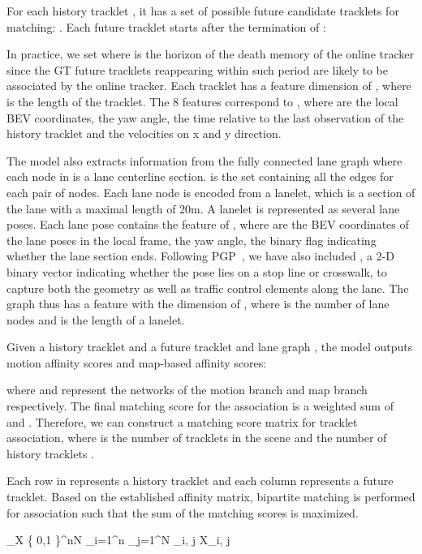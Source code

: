 \documentclass{article} \usepackage{iclr2023_conference,times}
\begin{document}
For each history tracklet , it has a set of possible future candidate tracklets for matching: . Each future tracklet  starts after the termination of : 



In practice, we set  where  is the horizon of the death memory of the online tracker since the GT future tracklets reappearing within such period are likely to be associated by the online tracker. Each tracklet has a feature dimension of , where  is the length of the tracklet. The 8 features correspond to , where  are the local BEV coordinates,  the yaw angle,  the time relative to the last observation of the history tracklet and  the velocities on x and y direction.

The model also extracts information from the fully connected lane graph  where each node in  is a lane centerline section.  is the set containing all the edges for each pair of nodes. Each lane node is encoded from a lanelet, which is a section of the lane with a maximal length of 20m. A lanelet is represented as several lane poses. Each lane pose contains the feature of , where  are the BEV coordinates of the lane poses in the local frame,  the yaw angle,  the binary flag indicating whether the lane section ends. Following PGP~\cite{PGP}, we have also included , a 2-D binary vector indicating whether the pose lies on a stop line or crosswalk, to capture both the geometry as well as traffic control elements along the lane. The graph thus has a feature with the dimension of , where  is the number of lane nodes and  is the length of a lanelet. 

Given a history tracklet  and a future tracklet  and lane graph , the model outputs motion affinity scores and map-based affinity scores:


where  and  represent the networks of the motion branch and map branch respectively. 
The final matching score for the association  is a weighted sum of  and . Therefore, we can construct a matching score matrix  for tracklet association, where  is the number of tracklets  in the scene and  the number of history tracklets . 



Each row in  represents a history tracklet and each column represents a future tracklet. Based on the established affinity matrix, bipartite matching is performed for association such that the sum of the matching scores is maximized. 



\max_{X \in \left\{ 0,1 \right\}^{n\times N}} \sum_{i=1}^n \sum_{j=1}^N _{i, j} X_{i, j}
\end{document}
